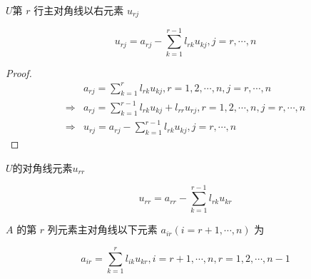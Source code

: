 \begin{corollary}
    $U$第 $ r $ 行主对角线以右元素 $ u_{r j} $

    \begin{equation} u_{r j}=a_{r j}-\sum_{k=1}^{r-1} l_{r k} u_{k j}, j = r, \cdots, n \end{equation}
\end{corollary}

\begin{proof}
    \begin{equation}\begin{aligned}
                        & a_{r j}=\sum_{k=1}^{r} l_{r k} u_{k j}, r=1,2, \cdots, n,j=r, \cdots, n                     \\
            \Rightarrow & a_{r j}=\sum_{k=1}^{r - 1} l_{r k} u_{k j} + l_{rr} u_{rj}, r=1,2, \cdots, n,j=r, \cdots, n \\
            \Rightarrow & u_{r j}=a_{r j}-\sum_{k=1}^{r-1} l_{r k} u_{k j}, j = r, \cdots, n
        \end{aligned}\end{equation}
\end{proof}


\begin{corollary}
    $U$的对角线元素$u_{r r}$

    \begin{equation} u_{r r}=a_{r r}-\sum_{k=1}^{r-1} l_{r k} u_{k r} \end{equation}
\end{corollary}


\begin{theorem}
    $ A $ 的第 $ r $ 列元素主对角线以下元素 $ a_{i r}(i=r+1, \cdots, n) $ 为

    \begin{equation}a_{i r}=\sum_{k=1}^{r} l_{i k} u_{k r}, i=r+1, \cdots, n, r=1,2, \cdots, n-1 \end{equation}
\end{theorem}

